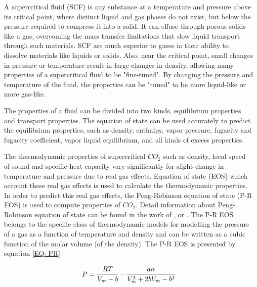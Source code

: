 \documentclass[../Article_Design_of_Experiment.tex]{subfiles}
\begin{document}
    A supercritical fluid (SCF) is any substance at a temperature and pressure above its critical point, where distinct liquid and gas phases do not exist, but below the pressure required to compress it into a solid. It can effuse through porous solids like a gas, overcoming the mass transfer limitations that slow liquid transport through such materials. SCF are much superior to gases in their ability to dissolve materials like liquids or solids. Also, near the critical point, small changes in pressure or temperature result in large changes in density, allowing many properties of a supercritical fluid to be "fine-tuned". By changing the pressure and temperature of the fluid, the properties can be "tuned" to be more liquid-like or more gas-like. 
    

    The properties of a fluid can be divided into two kinds, equilibrium properties and transport properties. The equation of state can be used accurately to predict the equilibrium properties, such as density, enthalpy, vapor pressure, fugacity and fugacity coefficient, vapor liquid equilibrium, and all kinds of excess properties.
    
    The thermodynamic properties of supercritical $CO_2$ such as density, local speed of sound and specific heat capacity vary significantly for slight change in temperature and pressure due to real gas effects. Equation of state (EOS) which account these real gas effects is used to calculate the thermodynamic properties. In order to predict this real gas effects, the Peng-Robinson equation of state (P-R EOS) is used to compute properties of $CO_2$. Detail information about Peng-Robinson equation of state can be found in the work of \citet{Peng1976}, \citet{Elliott2011} or \citet{Pratt2001}. The P-R EOS belongs to the specific class of thermodynamic models for modelling the pressure of a gas as a function of temperature and density and can be written as a cubic function of the molar volume (of the density). The P-R EOS is presented by equation \ref{EQ: PR}

    {\footnotesize
        \begin{equation}
            P = \cfrac{RT}{V_m - b} - \cfrac{a\alpha}{V_m^2 + 2bV_m - b^2}
            \label{EQ: PR}
        \end{equation}
    }
\end{document}
